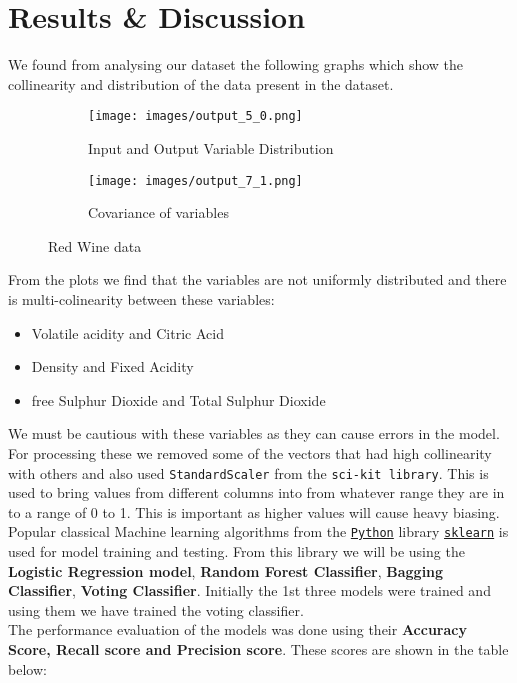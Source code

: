 \documentclass{article}
\begin{document}
\section{Results \& Discussion}
We found from analysing our dataset the following graphs which show the collinearity and distribution of the data present in the dataset.

\begin{figure}[h]

\begin{subfigure}{0.5\textwidth}
\texttt{[image: images/output\_5\_0.png]} 
\caption{Input and Output Variable Distribution}
\label{fig:subim1}
\end{subfigure}
\begin{subfigure}{0.5\textwidth}
\texttt{[image: images/output\_7\_1.png]}
\caption{Covariance of variables}
\label{fig:subim2}
\end{subfigure}

\caption{Red Wine data}
\label{fig:image2}
\end{figure}

From the plots we find that the variables are not uniformly distributed and there is multi-colinearity between these variables:

\begin{itemize}
    \item Volatile acidity and Citric Acid
    \item Density and Fixed Acidity
    \item free Sulphur Dioxide and Total Sulphur Dioxide
\end{itemize}
We must be cautious with these variables as they can cause errors in the model.\\
For processing these we removed some of the vectors that had high collinearity with others and also used \verb|StandardScaler| from the \verb|sci-kit library|. This is used to bring values from different columns into from whatever range they are in to a range of 0 to 1. This is important as higher values will cause heavy biasing.\\
Popular classical Machine learning algorithms from  the {\href{https://www.python.org/}{\texttt{Python}} library \href{https://scikit-learn.org/stable/index.html}{{\texttt{sklearn}}}} is used for model training and testing. From this library we will be using the \textbf{Logistic Regression model}, \textbf{Random Forest Classifier}, \textbf{Bagging Classifier}, \textbf{Voting Classifier}. Initially the 1st three models were trained and using them we have trained the voting classifier.\\ 
The performance evaluation of the models was done using their \textbf{Accuracy Score, Recall score and Precision score}. These scores are shown in the table below: 
\end{document}
